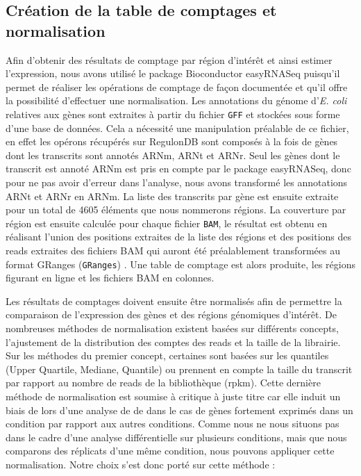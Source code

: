 \documentclass[12pt,a4paper]{report}
\begin{document}
\begin{onehalfspace}
\section*{Création de la table de comptages et normalisation}
Afin d'obtenir des résultats de comptage par région d'intérêt et ainsi estimer l'expression, nous avons utilisé le package Bioconductor easyRNASeq \citep{Delhomme2012} puisqu'il permet de réaliser les opérations de comptage de façon documentée et qu'il offre la possibilité d'effectuer une normalisation. Les annotations du génome d'\textit{E. coli} relatives aux gènes sont extraites à partir du fichier \texttt{GFF} et stockées sous forme d'une base de données. Cela a nécessité une manipulation préalable de ce fichier, en effet les opérons récupérés sur RegulonDB sont composés à la fois de gènes dont les transcrits sont annotés ARNm, ARNt et ARNr. Seul les gènes dont le transcrit est annoté ARNm est pris en compte par le package easyRNASeq, donc pour ne pas avoir d'erreur dans l'analyse, nous avons transformé les annotations ARNt et ARNr en ARNm.
La liste des transcrits par gène est ensuite extraite pour un total de 4605 éléments que nous nommerons régions. La couverture par région est ensuite calculée pour chaque fichier \texttt{BAM}, le résultat est obtenu en réalisant l'union des positions extraites de la liste des régions et des positions des reads extraites des fichiers BAM qui auront été préalablement transformées au format \gls{GRanges} (\texttt{GRanges})  \citep{Lawrence2013}. Une table de comptage est alors produite, les régions figurant en ligne et les fichiers BAM en colonnes.

Les résultats de comptages doivent ensuite être normalisés afin de permettre la comparaison de l'expression des gènes et des régions génomiques d'intérêt. De nombreuses méthodes de normalisation existent basées sur différents concepts, l'ajustement de la distribution des comptes des reads et la taille de la librairie. Sur les méthodes du premier concept, certaines sont basées sur les quantiles (Upper Quartile, Mediane, Quantile) ou prennent en compte la taille du transcrit par rapport au nombre de reads de la bibliothèque (\gls{rpkm}). Cette dernière méthode de normalisation est soumise à critique à juste titre \citep{Dillies2013} car elle induit un biais de lors d'une analyse de \gls{de} dans le cas de gènes fortement exprimés dans un condition par rapport aux autres conditions. Comme nous ne nous situons pas dans le cadre d'une analyse différentielle sur plusieurs conditions, mais que nous comparons des réplicats d'une même condition, nous pouvons appliquer cette normalisation. Notre choix s'est donc porté sur cette méthode \citep{Mortazavi2008} :


\end{onehalfspace}
\end{document}
